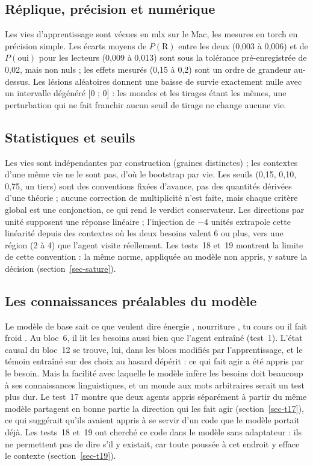 \documentclass[11pt,a4paper]{article}
\begin{document}
\subsection{Réplique, précision et numérique}

Les vies d'apprentissage sont vécues en mlx sur le Mac, les mesures en torch en
précision simple. Les écarts moyens de $P(\mathrm R)$ entre les deux (0,003 à 0,006)
et de $P(\text{oui})$ pour les lecteurs (0,009 à 0,013) sont sous la tolérance
pré-enregistrée de 0,02, mais non nuls ; les effets mesurés (0,15 à 0,2) sont un
ordre de grandeur au-dessus. Les lésions aléatoires donnent une baisse de survie
exactement nulle avec un intervalle dégénéré [0 ; 0] : les mondes et les tirages
étant les mêmes, une perturbation qui ne fait franchir aucun seuil de tirage ne
change aucune vie.

\subsection{Statistiques et seuils}

Les vies sont indépendantes par construction (graines distinctes) ; les contextes
d'une même vie ne le sont pas, d'où le bootstrap par vie. Les seuils (0,15, 0,10,
0,75, un tiers) sont des conventions fixées d'avance, pas des quantités dérivées
d'une théorie ; aucune correction de multiplicité n'est faite, mais chaque critère
global est une conjonction, ce qui rend le verdict conservateur. Les directions
\og par unité \fg{} supposent une réponse linéaire ; l'injection de $-4$ unités
extrapole cette linéarité depuis des contextes où les deux besoins valent 6 ou plus,
vers une région (2 à 4) que l'agent visite réellement. Les tests~18 et~19 montrent la limite de
cette convention : la même norme, appliquée au modèle non appris, y sature la décision
(section~\ref{sec-sature}).

\subsection{Les connaissances préalables du modèle}

Le modèle de base sait ce que veulent dire \og énergie \fg{}, \og nourriture \fg{},
\og tu cours \fg{} ou \og il fait froid \fg{}. Au bloc~6, il lit les besoins aussi bien
que l'agent entraîné (test~1). L'état causal du bloc~12 se trouve, lui, dans les
blocs modifiés par l'apprentissage, et le témoin entraîné sur des choix au hasard
dépérit : ce qui fait agir a été appris par le besoin. Mais la facilité avec
laquelle le modèle infère les besoins doit beaucoup à ses connaissances
linguistiques, et un monde aux mots arbitraires serait un test plus dur. Le test~17
montre que deux agents appris séparément à partir du même modèle partagent en bonne partie
la direction qui les fait agir (section~\ref{sec-t17}), ce qui suggérait qu'ils avaient appris
à se servir d'un code que le modèle portait déjà. Les tests~18 et~19 ont cherché ce code dans
le modèle sans adaptateur : ils ne permettent pas de dire s'il y existait, car toute poussée à
cet endroit y efface le contexte (section~\ref{sec-t19}).
\end{document}
